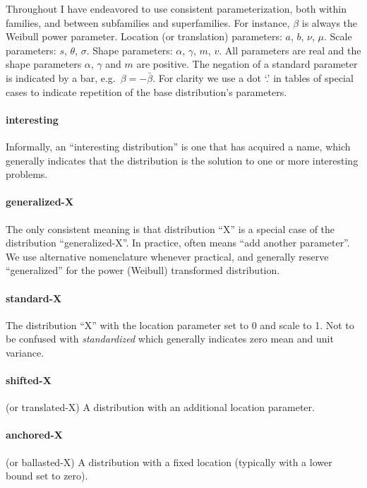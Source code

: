 Throughout I have endeavored to use consistent parameterization, both within families, and between subfamilies and superfamilies. For instance, $\beta$ is always the Weibull power parameter. Location (or translation) parameters: $a$, $b$, $\nu$, $\mu$. Scale parameters: $s$, $\theta$, $\sigma$. Shape parameters: $\alpha$, $\gamma$, $m$, $v$. All parameters are real and the shape parameters $\alpha$, $\gamma$ and $m$ are positive. The negation of a standard parameter is indicated by a bar, e.g.\ $\beta = -\bar{\beta}$. 
For clarity we use a dot `.' in tables of special cases to indicate repetition of the base distribution's parameters. 



 
 
\paragraph*{interesting}  Informally, an ``interesting distribution'' is one that has acquired a name, which generally indicates that the distribution is the solution to one or more interesting problems.

\paragraph*{generalized-X}  The only consistent meaning is that distribution ``X'' is a special case of the distribution ``generalized-X''.  In practice, often means ``add another parameter''.  We use alternative nomenclature whenever practical, and generally reserve ``generalized'' for the power (Weibull) transformed distribution. 

\paragraph*{standard-X}   The distribution ``X'' with the location parameter set to 0 and scale to 1. Not to be confused with {\it standardized} which generally indicates zero mean and unit variance. 

\paragraph*{shifted-X}  (or translated-X) A distribution with an additional location parameter. 

\paragraph*{anchored-X}  (or ballasted-X) A distribution with a fixed location (typically with a lower bound set to zero).

